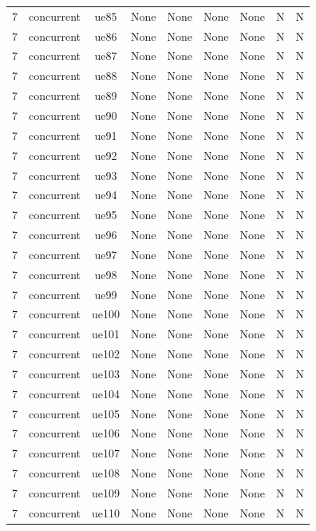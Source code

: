 \begin{table}[ht]
\begin{tabular}{|c|c|c|c|c|c|c|c|c|}
7 & concurrent & ue85 & None & None & None & None & N & N \\
7 & concurrent & ue86 & None & None & None & None & N & N \\
7 & concurrent & ue87 & None & None & None & None & N & N \\
7 & concurrent & ue88 & None & None & None & None & N & N \\
7 & concurrent & ue89 & None & None & None & None & N & N \\
7 & concurrent & ue90 & None & None & None & None & N & N \\
7 & concurrent & ue91 & None & None & None & None & N & N \\
7 & concurrent & ue92 & None & None & None & None & N & N \\
7 & concurrent & ue93 & None & None & None & None & N & N \\
7 & concurrent & ue94 & None & None & None & None & N & N \\
7 & concurrent & ue95 & None & None & None & None & N & N \\
7 & concurrent & ue96 & None & None & None & None & N & N \\
7 & concurrent & ue97 & None & None & None & None & N & N \\
7 & concurrent & ue98 & None & None & None & None & N & N \\
7 & concurrent & ue99 & None & None & None & None & N & N \\
7 & concurrent & ue100 & None & None & None & None & N & N \\
7 & concurrent & ue101 & None & None & None & None & N & N \\
7 & concurrent & ue102 & None & None & None & None & N & N \\
7 & concurrent & ue103 & None & None & None & None & N & N \\
7 & concurrent & ue104 & None & None & None & None & N & N \\
7 & concurrent & ue105 & None & None & None & None & N & N \\
7 & concurrent & ue106 & None & None & None & None & N & N \\
7 & concurrent & ue107 & None & None & None & None & N & N \\
7 & concurrent & ue108 & None & None & None & None & N & N \\
7 & concurrent & ue109 & None & None & None & None & N & N \\
7 & concurrent & ue110 & None & None & None & None & N & N \\

\end{tabular}
\end{table}
